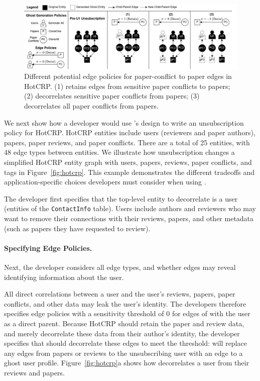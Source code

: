 \begin{figure}[ht!]
    \centering
    \includegraphics[width=\textwidth]{img/pcs}

    \caption{Different potential edge policies for paper-conflict to paper edges in HotCRP.
    (1) retains edges from sensitive paper conflicts to papers; (2) decorrelates sensitive
    paper conflicts from papers; (3) decorrelates all paper conflicts from papers.}
    \label{fig:pcs}
\end{figure}

We next show how a developer would use \sys's design to write an unsubscription policy for HotCRP. 
HotCRP entities include users (reviewers and paper authors), papers, paper reviews, and paper
conflicts. There are a total of 25 entities, with 48 edge types between entities.
We illustrate how unsubscription changes a simplified HotCRP entity graph with users, papers,
reviews, paper conflicts, and tags in Figure~\ref{fig:hotcrp}.
This example demonstrates the different tradeoffs and application-specific choices developers must
consider when using \sys.

The developer first specifies that the top-level entity to decorrelate is a user (entities of the
\texttt{ContactInfo} table). Users include authors and reviewers who may want to remove their
connections with their reviews, papers, and other metadata (such as papers they have requested to
review).

\paragraph{Specifying Edge Policies.}
Next, the developer considers all edge types, and whether edges may reveal identifying information
about the user.

All direct correlations between a user and the user's reviews, papers, paper conflicts, and other
data may leak the user's identity. The developers therefore specifies edge policies with a
sensitivity threshold of 0 for edges of with the user as a direct parent.  Because HotCRP should
retain the paper and review data, and merely decorrelate these data from their author's identity,
the developer specifies that \sys should decorrelate these edges to meet the threshold: \sys will
replace any edges from papers or reviews to the unsubscribing user with an edge to a ghost user
profile. Figure~\ref{fig:hotcrp}a shows how \sys decorrelates a user from
their reviews and papers.

